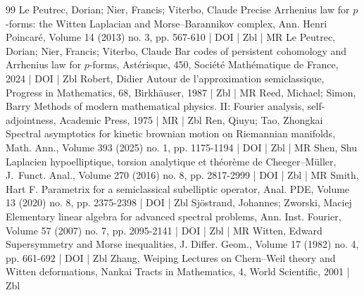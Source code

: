\documentclass[10pt]{amsart}
\theoremstyle{definition}\newtheorem{defi}[theo]{Definition}\newtheorem{rema}[theo]{Remark}\newtheorem{exam}[theo]{Example}\newtheorem{exem}[theo]{Example}\newtheorem{nota}[theo]{Notation}
\begin{document}
\begin{thebibliography}{99}
 Le Peutrec, Dorian; Nier, Francis; Viterbo, Claude Precise Arrhenius law for $p$-forms: the Witten Laplacian and Morse–Barannikov complex, Ann. Henri Poincaré, Volume 14 (2013) no. 3, pp. 567-610 | DOI | Zbl | MR
 Le Peutrec, Dorian; Nier, Francis; Viterbo, Claude Bar codes of persistent cohomology and Arrhenius law for $p$-forms, Astérisque, 450, Société Mathématique de France, 2024 | DOI | Zbl
 Robert, Didier Autour de l’approximation semiclassique, Progress in Mathematics, 68, Birkhäuser, 1987 | Zbl | MR
 Reed, Michael; Simon, Barry Methods of modern mathematical physics. II: Fourier analysis, self-adjointness, Academic Press, 1975 | MR | Zbl
 Ren, Qiuyu; Tao, Zhongkai Spectral asymptotics for kinetic brownian motion on Riemannian manifolds, Math. Ann., Volume 393 (2025) no. 1, pp. 1175-1194 | DOI | Zbl | MR
 Shen, Shu Laplacien hypoelliptique, torsion analytique et théorème de Cheeger–Müller, J. Funct. Anal., Volume 270 (2016) no. 8, pp. 2817-2999 | DOI | Zbl | MR
 Smith, Hart F. Parametrix for a semiclassical subelliptic operator, Anal. PDE, Volume 13 (2020) no. 8, pp. 2375-2398 | DOI | Zbl
 Sjöstrand, Johannes; Zworski, Maciej Elementary linear algebra for advanced spectral problems, Ann. Inst. Fourier, Volume 57 (2007) no. 7, pp. 2095-2141 | DOI | Zbl | MR
 Witten, Edward Supersymmetry and Morse inequalities, J. Differ. Geom., Volume 17 (1982) no. 4, pp. 661-692 | DOI | Zbl
 Zhang, Weiping Lectures on Chern–Weil theory and Witten deformations, Nankai Tracts in Mathematics, 4, World Scientific, 2001 | Zbl
\end{thebibliography}
\end{document}

